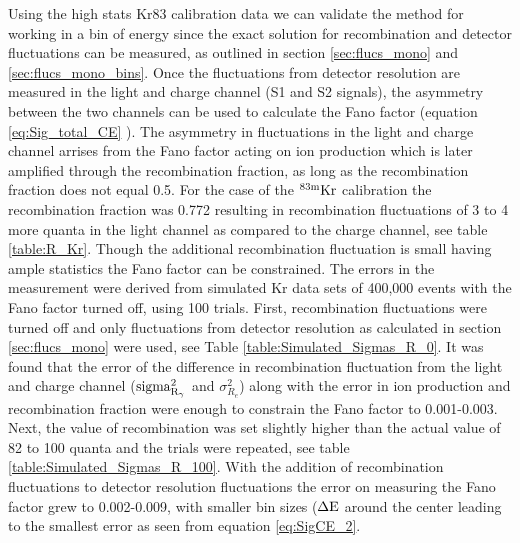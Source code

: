 Using the high stats Kr83 calibration data we can validate the method for working in a bin of energy since the exact solution for recombination and detector fluctuations can be measured, as outlined in section \ref{sec:flucs_mono} and \ref{sec:flucs_mono_bins}. Once the fluctuations from detector resolution are measured in the light and charge channel (S1 and S2 signals), the asymmetry between the two channels can be used to calculate the Fano factor (equation \ref{eq:Sig_total_CE} ). The asymmetry in fluctuations in the light and charge channel arrises from the Fano factor acting on ion production which is later amplified through the recombination fraction, as long as the recombination fraction does not equal 0.5. For the case of the $\rm ^{83m}Kr$ calibration the recombination fraction was 0.772 resulting in recombination fluctuations of 3 to 4 more quanta in the light channel as compared to the charge channel, see table \ref{table:R_Kr}. Though the additional recombination fluctuation is small having ample statistics the Fano factor can be constrained. 
The errors in the measurement were derived from simulated Kr data sets of 400,000 events with the Fano factor turned off, using 100 trials. First, recombination fluctuations were turned off and only fluctuations from detector resolution as calculated in section \ref{sec:flucs_mono} were used, see Table \ref{table:Simulated_Sigmas_R_0}. It was found that the error of the difference in recombination fluctuation from the light and charge channel ($\rm sigma_{R_{\gamma}}^2$ and $\sigma_{R_{e}}^2 $) along with the error in ion production and recombination fraction were enough to constrain the Fano factor to 0.001-0.003. Next, the value of recombination was set slightly higher than the actual value of 82 to 100 quanta and the trials were repeated, see table \ref{table:Simulated_Sigmas_R_100}. With the addition of recombination fluctuations to detector resolution fluctuations the error on measuring the Fano factor grew to 0.002-0.009, with smaller bin sizes ($\rm\Delta E$ around the center leading to the smallest error as seen from equation \ref{eq:SigCE_2}.


